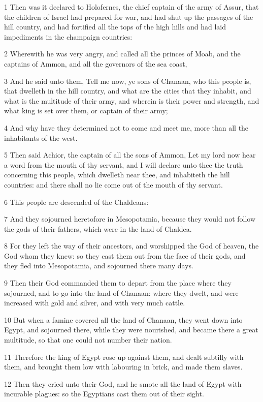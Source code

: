 \par 1 Then was it declared to Holofernes, the chief captain of the army of Assur, that the children of Israel had prepared for war, and had shut up the passages of the hill country, and had fortified all the tops of the high hills and had laid impediments in the champaign countries:
\par 2 Wherewith he was very angry, and called all the princes of Moab, and the captains of Ammon, and all the governors of the sea coast,
\par 3 And he said unto them, Tell me now, ye sons of Chanaan, who this people is, that dwelleth in the hill country, and what are the cities that they inhabit, and what is the multitude of their army, and wherein is their power and strength, and what king is set over them, or captain of their army;
\par 4 And why have they determined not to come and meet me, more than all the inhabitants of the west.
\par 5 Then said Achior, the captain of all the sons of Ammon, Let my lord now hear a word from the mouth of thy servant, and I will declare unto thee the truth concerning this people, which dwelleth near thee, and inhabiteth the hill countries: and there shall no lie come out of the mouth of thy servant.
\par 6 This people are descended of the Chaldeans:
\par 7 And they sojourned heretofore in Mesopotamia, because they would not follow the gods of their fathers, which were in the land of Chaldea.
\par 8 For they left the way of their ancestors, and worshipped the God of heaven, the God whom they knew: so they cast them out from the face of their gods, and they fled into Mesopotamia, and sojourned there many days.
\par 9 Then their God commanded them to depart from the place where they sojourned, and to go into the land of Chanaan: where they dwelt, and were increased with gold and silver, and with very much cattle.
\par 10 But when a famine covered all the land of Chanaan, they went down into Egypt, and sojourned there, while they were nourished, and became there a great multitude, so that one could not number their nation.
\par 11 Therefore the king of Egypt rose up against them, and dealt subtilly with them, and brought them low with labouring in brick, and made them slaves.
\par 12 Then they cried unto their God, and he smote all the land of Egypt with incurable plagues: so the Egyptians cast them out of their sight.

